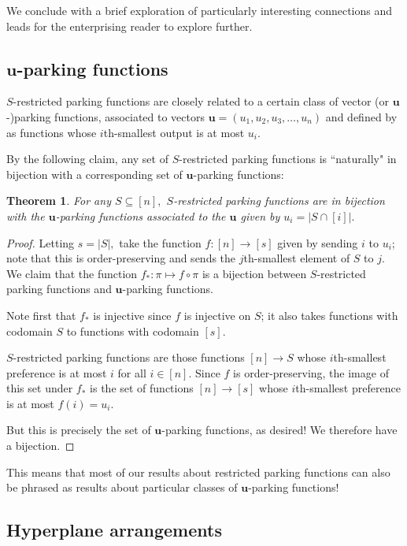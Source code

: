 \documentclass[12 pt]{amsart}
\newtheorem{theorem}{Theorem}
\theoremstyle{definition} %
\theoremstyle{remark} %
\begin{document}
We conclude with a brief exploration of particularly interesting connections and leads for the enterprising reader to explore further.

\subsection{\texorpdfstring{$\mathbf{u}$}{Vector}-parking functions}

$S$-restricted parking functions are closely related to a certain class of vector (or $\mathbf{u}$-)parking functions, associated to vectors $\mathbf{u}=(u_1,u_2,u_3,\ldots,u_n)$ and defined by \cite{yan-survey-2015} as functions whose $i$th-smallest output is at most $u_i$. 

By the following claim, any set of $S$-restricted parking functions is ``naturally" in bijection with a corresponding set of $\mathbf{u}$-parking functions:

\begin{theorem}
    For any $S\subseteq[n],$ $S$-restricted parking functions are in bijection with the $\mathbf{u}$-parking functions associated to the $\mathbf{u}$ given by $u_i=|S\cap [i]|.$
\end{theorem}
\begin{proof}
    Letting $s=|S|,$ take the function $f:[n]\to [s]$ given by sending $i$ to $u_i$; note that this is order-preserving and sends the $j$th-smallest element of $S$ to $j$. We claim that the function $f_*: \pi\mapsto f\circ \pi$ is a bijection between $S$-restricted parking functions and $\mathbf{u}$-parking functions.

    Note first that $f_*$ is injective since $f$ is injective on $S$; it also takes functions with codomain $S$ to functions with codomain $[s].$
    
    $S$-restricted parking functions are those functions $[n]\to S$ whose $i$th-smallest preference is at most $i$ for all $i\in [n]$. Since $f$ is order-preserving, the image of this set under $f_*$ is the set of functions $[n]\to [s]$ whose $i$th-smallest preference is at most $f(i)=u_i.$

    But this is precisely the set of $\mathbf{u}$-parking functions, as desired! We therefore have a bijection.
\end{proof}

This means that most of our results about restricted parking functions can also be phrased as results about particular classes of $\mathbf{u}$-parking functions!

\subsection{Hyperplane arrangements}
\end{document}
